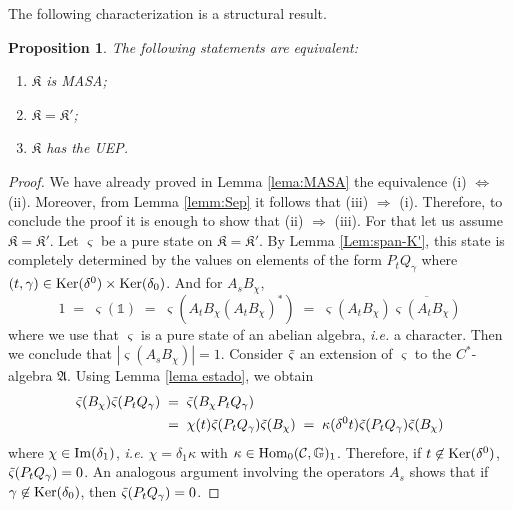 \documentclass[a4paper,12pt,twoside,reqno]{amsart}
\theoremstyle{plain}
\newtheorem{prop}[teo]{Proposition}
\theoremstyle{definition}
\theoremstyle{remark}
\numberwithin{equation}{section}
\numberwithin{figure}{section}
\numberwithin{table}{section}
\newcommand{\f}[1]{\mathcal{#1}}
\newcommand{\n}[1]{\mathbb{#1}}
\begin{document}
	\medskip
	
	The following characterization is a structural result. 
	
	
	
	\begin{prop}\label{porp:struc}
		The following statements are equivalent:
		\begin{enumerate}
			\item[(i)] $\mathfrak{K}$ is MASA;
			\item[(ii)] $\mathfrak{K}=\mathfrak{K}'$;
			\item[(iii)] $\mathfrak{K}$ has the UEP.
		\end{enumerate}
	\end{prop}
	
	
	\begin{proof}
		We have already proved in Lemma \ref{lema:MASA} the  equivalence (i) $\Leftrightarrow$ (ii). Moreover, from Lemma \ref{lemm:Sep} it follows that (iii) $\Rightarrow$ (i). Therefore, to conclude the proof it is enough to show that (ii) $\Rightarrow$ (iii). For that let us assume  $\mathfrak{K}=\mathfrak{K}'$. 
		Let $\varsigma$ be 	
		a pure state on $\mathfrak{K}=\mathfrak{K}'$.
		By Lemma \ref{Lem:span-K'}, this state is completely determined by the values on elements of the form $P_tQ_\gamma$ where $(t,\gamma)\in {\rm Ker}(\delta^0)\times {\rm Ker}(\delta_0)$. And for $A_sB_\chi$, 
		\begin{equation}\label{eq:mos_purst}
			1\;=\;\varsigma(\n{1})\;=\;\varsigma(A_tB_\chi(A_tB_\chi)^*)\;=\;\varsigma(A_tB_\chi)\overline{\varsigma(A_tB_\chi)}
		\end{equation}
		where we use that $\varsigma$ is a pure state of an abelian algebra, \emph{i.e.} a character. Then we conclude that $|\varsigma(A_sB_\chi)|=1$. Consider $\Tilde{\varsigma}$ an extension of $\varsigma$ to the $C^*$-algebra $\mathfrak{A}$. Using Lemma \ref{lema estado},  we obtain
		\begin{equation}
			\begin{aligned}
				\Tilde{\varsigma}(B_\chi)\Tilde{\varsigma}(P_tQ_\gamma)\;&=\;\Tilde{\varsigma}(B_\chi P_tQ_\gamma)\\
				&=\;\chi(t)\Tilde{\varsigma}(P_tQ_\gamma)\Tilde{\varsigma}(B_\chi)\;=\;\kappa(\delta^0 t)\Tilde{\varsigma}(P_tQ_\gamma)\Tilde{\varsigma}(B_\chi)
			\end{aligned}
		\end{equation}
		where $\chi\in {\rm Im}({\delta_1})$, \emph{i.e.} $\chi=\delta_1\kappa$ with $\kappa\in {\rm Hom}_0(\f{C},\n{G})_1$. Therefore, if $t\not\in {\rm Ker}(\delta^0)$, $\Tilde{\varsigma}(P_tQ_\gamma)=0$. An analogous argument involving the operators $A_s$ shows that if $\gamma\not\in {\rm Ker}(\delta_0)$, then $\Tilde{\varsigma}(P_tQ_\gamma)=0$.

\end{proof}
\end{document}
